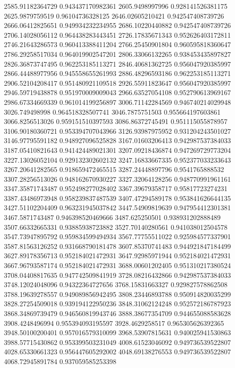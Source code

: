 {2585.91182364729 0.943437170982361
2605.9498997996 0.928141526381175
2625.9879759519 0.96104736328125
2646.02605210421 0.942547408739726
2666.06412825651 0.949934232234955
2686.10220440882 0.942547408739726
2706.14028056112 0.964438283443451
2726.17835671343 0.952626403172811
2746.21643286573 0.960413388411204
2766.25450901804 0.960595818360647
2786.29258517034 0.964019902547201
2806.33066132265 0.938453435897827
2826.36873747495 0.962253185113271
2846.40681362725 0.956047920385997
2866.44488977956 0.945558655261993
2886.48296593186 0.962253185113271
2906.52104208417 0.951480921109518
2926.55911823647 0.956047920385997
2946.59719438878 0.951970009009043
2966.63527054108 0.952790613969167
2986.67334669339 0.961014199256897
3006.71142284569 0.946740214029948
3026.749498998 0.964518328507741
3046.7875751503 0.955664197603861
3066.8256513026 0.959151510397593
3086.86372745491 0.951115055878957
3106.90180360721 0.953394707043966
3126.93987975952 0.931204243501027
3146.97795591182 0.948927096525828
3167.01603206413 0.942987537384033
3187.05410821643 0.941424489021301
3207.09218436874 0.947269729773204
3227.13026052104 0.929132302602132
3247.16833667335 0.952377033233643
3267.20641282565 0.918659472465515
3287.24448897796 0.9541765888532
3307.28256513026 0.948162670930227
3327.32064128256 0.948770991961161
3347.35871743487 0.952498277028402
3367.39679358717 0.95817723274231
3387.43486973948 0.958239837487539
3407.47294589178 0.953841626644135
3427.51102204409 0.963231945037842
3447.54909819639 0.947954412301381
3467.5871743487 0.946398520469666
3487.625250501 0.938931202888489
3507.66332665331 0.93885938723882
3527.70140280561 0.941038012504578
3547.73947895792 0.959834599494934
3567.77755511022 0.925984577337901
3587.81563126252 0.931668790181478
3607.85370741483 0.944921847184499
3627.89178356713 0.952184021472931
3647.92985971944 0.952184021472931
3667.96793587174 0.952184021472931
3688.00601202405 0.951310217380524
3708.04408817635 0.947742509841919
3728.08216432866 0.942987537384033
3748.12024048096 0.94322364727656
3768.15831663327 0.929827578862508
3788.19639278557 0.949089856942495
3808.23446893788 0.950914820035299
3828.27254509018 0.939194122950236
3848.31062124248 0.952572186787923
3868.34869739479 0.946560819943746
3888.38677354709 0.944655088583628
3908.4248496994 0.955394093195597
3928.4629258517 0.965305626392365
3948.50100200401 0.957016579310099
3968.53907815631 0.940025941530863
3988.57715430862 0.953399503231049
4008.61523046092 0.949736539522807
4028.65330661323 0.956447605292002
4048.69138276553 0.949736539522807
4068.72945891784 0.937059585253398
}
